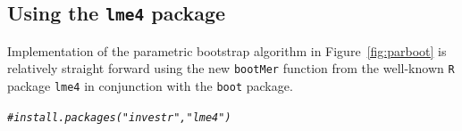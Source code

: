 \documentclass{article}\usepackage[]{graphicx}\usepackage[]{color}
\makeatletter
\newcommand{\hlcom}[1]{\textcolor[rgb]{0.678,0.584,0.686}{\textit{#1}}}%
\newenvironment{kframe}{%
 \def\at@end@of@kframe{}%
 \ifinner\ifhmode%
  \def\at@end@of@kframe{\end{minipage}}%
  \begin{minipage}{\columnwidth}%
 \fi\fi%
 \def\FrameCommand##1{\hskip\@totalleftmargin \hskip-\fboxsep
 \colorbox{shadecolor}{##1}\hskip-\fboxsep
     \hskip-\linewidth \hskip-\@totalleftmargin \hskip\columnwidth}%
 \MakeFramed {\advance\hsize-\width
   \@totalleftmargin\z@ \linewidth\hsize
   \@setminipage}}%
 {\par\unskip\endMakeFramed%
 \at@end@of@kframe}
\newenvironment{knitrout}{}{} %
\makeatother
\begin{document}
\subsection[Using the lme4 package]{Using the \texttt{lme4} package}
\label{sec:lme4}

Implementation of the parametric bootstrap algorithm in Figure~\ref{fig:parboot} is relatively straight forward using the new \texttt{bootMer} function from the well-known \texttt{R} package \texttt{lme4} \citep{bates-lme4-2014} in conjunction with the \texttt{boot} package.

\begin{knitrout}
\color{fgcolor}\begin{kframe}
\begin{alltt}
\hlcom{# install.packages("investr", "lme4")}
\end{alltt}
\end{kframe}
\end{knitrout}
\end{document}
